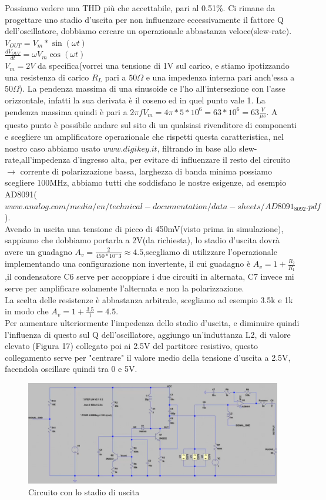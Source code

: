 \documentclass{article}
\begin{document}
Possiamo vedere una THD più che accettabile, pari al 0.51\%.
Ci rimane da progettare uno stadio d'uscita per non influenzare eccessivamente il fattore Q dell'oscillatore, dobbiamo cercare un operazionale abbastanza veloce(slew-rate).
$V_{OUT}=V_m * \sin(\omega t) $\\\Large $\frac{dV_{OUT}}{dt}=\omega V_m \cos(\omega t)$\\\normalsize $V_m=2V$ \normalsize da specifica(vorrei una tensione di 1V sul carico, e stiamo ipotizzando una resistenza di carico $R_L$ pari a $50\Omega$ e una impedenza interna pari anch'essa a $50\Omega$).
La pendenza massima di una sinusoide ce l'ho all'intersezione con l'asse orizzontale, infatti la sua derivata è il coseno ed in quel punto vale 1.
La pendenza massima quindi è pari a $2 \pi f V_m=4\pi * 5 *10^6=63*10^6=63\frac{V}{\mu s}$.
A questo punto è possibile andare sul sito di un qualsiasi rivenditore di componenti e scegliere un amplificatore operazionale che rispetti questa caratteristica, nel nostro caso abbiamo usato $www.digikey.it$, filtrando in base allo slew-rate,all'impedenza d'ingresso alta, per evitare di influenzare il resto del circuito $\rightarrow$ corrente di polarizzazione bassa, larghezza di banda minima possiamo scegliere 100MHz, abbiamo tutti che soddisfano le nostre esigenze, ad esempio AD8091($www.analog.com/media/en/technical-documentation/data-sheets/AD8091_8092.pdf$).\\
Avendo in uscita una tensione di picco di 450mV(visto prima in simulazione), sappiamo che dobbiamo portarla a 2V(da richiesta), lo stadio d'uscita dovrà avere un guadagno \Large$A_v=\frac{2}{450*10^-3}\approx 4.5$,\normalsize scegliamo di utilizzare l'operazionale implementando una configurazione non invertente, il cui guadagno è \Large$A_v=1+\frac{R_2}{R_1}$,\normalsize il condensatore C6 serve per accoppiare i due circuiti in alternata, C7 invece mi serve per amplificare solamente l'alternata e non la polarizzazione.\\La scelta delle resistenze è abbastanza arbitrale, scegliamo ad esempio 3.5k e 1k in modo che \Large$A_v=1+\frac{3.5}{1}=4.5$.\normalsize \\Per aumentare ulteriormente l'impedenza dello stadio d'uscita, e diminuire quindi l'influenza di questo sul Q dell'oscillatore, aggiungo un'induttanza L2, di valore elevato (Figura 17) collegato poi ai 2.5V del partitore resistivo, questo collegamento serve per "centrare" il valore medio della tensione d'uscita a 2.5V, facendola oscillare quindi tra 0 e 5V.
~\begin{figure}[H]
\includegraphics[width=\textwidth]{CircuitoConBuffer}
\centering
\caption{Circuito con lo stadio di uscita}
\label{fig:foo}
\end{figure}
\end{document}
